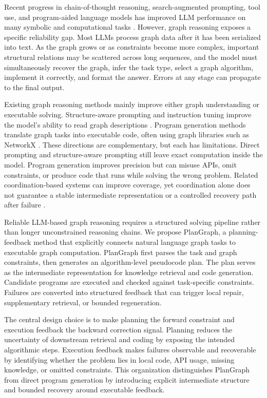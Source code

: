 \documentclass[pdflatex,sn-mathphys-num]{sn-jnl}
\theoremstyle{thmstyleone}
\theoremstyle{thmstyletwo}
\theoremstyle{thmstylethree}
\begin{document}
Recent progress in chain-of-thought reasoning, search-augmented prompting, tool use, and program-aided language models has improved LLM performance on many symbolic and computational tasks \cite{wei2022chain,wang2023selfconsistency,yao2023tree,besta2024graph,gao2023pal,yao2023react}. However, graph reasoning exposes a specific reliability gap. Most LLMs process graph data after it has been serialized into text. As the graph grows or as constraints become more complex, important structural relations may be scattered across long sequences, and the model must simultaneously recover the graph, infer the task type, select a graph algorithm, implement it correctly, and format the answer. Errors at any stage can propagate to the final output.

Existing graph reasoning methods mainly improve either graph understanding or executable solving. Structure-aware prompting and instruction tuning improve the model's ability to read graph descriptions \cite{tang2024graphgpt,chai2023graphllm,graphinstruct2024}. Program generation methods translate graph tasks into executable code, often using graph libraries such as NetworkX \cite{hagberg2008networkx,zhang2025gcoder}. These directions are complementary, but each has limitations. Direct prompting and structure-aware prompting still leave exact computation inside the model. Program generation improves precision but can misuse APIs, omit constraints, or produce code that runs while solving the wrong problem. Related coordination-based systems can improve coverage, yet coordination alone does not guarantee a stable intermediate representation or a controlled recovery path after failure \cite{li2024graphteam}.

Reliable LLM-based graph reasoning requires a structured solving pipeline rather than longer unconstrained reasoning chains. We propose PlanGraph, a planning-feedback method that explicitly connects natural language graph tasks to executable graph computation. PlanGraph first parses the task and graph constraints, then generates an algorithm-level pseudocode plan. The plan serves as the intermediate representation for knowledge retrieval and code generation. Candidate programs are executed and checked against task-specific constraints. Failures are converted into structured feedback that can trigger local repair, supplementary retrieval, or bounded regeneration.

The central design choice is to make planning the forward constraint and execution feedback the backward correction signal. Planning reduces the uncertainty of downstream retrieval and coding by exposing the intended algorithmic steps. Execution feedback makes failures observable and recoverable by identifying whether the problem lies in local code, API usage, missing knowledge, or omitted constraints. This organization distinguishes PlanGraph from direct program generation by introducing explicit intermediate structure and bounded recovery around executable feedback.
\end{document}

